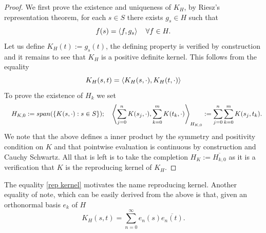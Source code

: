 \documentclass[
    a4paper,
    DIV=14,
    abstract=true,
    numbers=noenddot
]{scrartcl}
\begin{document}
\begin{proof}
	We first prove the existence and uniqueness of $K_H$, by Riesz's representation theorem, for each $s\in S$ there exists $g_s\in H$ such that
	\begin{equation*}
		f(s)=\left\langle f,g_s\right\rangle\quad\forall f\in H.
	\end{equation*}
	Let us define $K_H(t):=g_s(t)$, the defining property is verified by construction and it remains to see that $K_H$ is a positive definite
	kernel. This follows from the equality
	\begin{equation}\label{rep kernel}
		K_H(s,t)=\left\langle K_H(s,\cdot ),K_H(t,\cdot )\right\rangle
	\end{equation}
	To prove the existence of $H_k$ we set
	\begin{equation*}
		\quad H_{K,0}:=span(\{K(s,\cdot ):s\in S\});\quad \left\langle\sum_{j=0}^{n}K(s_j,\cdot ),\sum_{k=0}^{m} K(t_k,\cdot )\right\rangle_{H_{K,0}}:=\sum_{j=0}^{n}\sum_{k=0}^{m}K(s_j,t_k).
	\end{equation*}
	We note that the above defines a inner product by the symmetry and positivity condition on $K$ and that pointwise evaluation is continuous by construction and Cauchy Schwartz. All that is left is to take the completion  $H_K:=\overline{H_{k,0}}$ as it is a verification that $K$ is the reproducing kernel of  $K_H$.
\end{proof}
The equality \eqref{rep kernel} motivates the name reproducing kernel. Another equality of note, which can be easily derived from the above is that, given an orthonormal basis $e_k$ of $H$
\begin{equation*}
	K_H(s,t)=\sum_{n=0}^{\infty} e_n(s)\overline{e_n(t)}.
\end{equation*}
\end{document}
